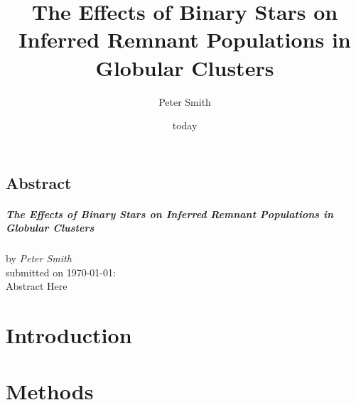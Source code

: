 \documentclass[12pt, oneside]{smuthesis}
\begin{document}
\frontmatter
\title{\sc The Effects of Binary Stars on Inferred Remnant Populations in Globular Clusters}
\author{Peter Smith}
\date{today}
\medskip

\maketitle
\pagestyle{headings}





\newcommand{\ps}[1]{{\color{NavyBlue} Peter: #1}}


\begin{center}
    \section*{\center \sc Abstract}
\paragraph*{\center \sc The Effects of Binary Stars on Inferred Remnant Populations in Globular Clusters\\}
    by {\em Peter Smith}\\
    submitted on \today:\\

    Abstract Here


\end{center}
\newpage

\tableofcontents
\listoffigures
\listoftables
\newpage
%


\mainmatter
\chapter{Introduction}

\newpage

\chapter{Methods}

\newpage
\end{document}
